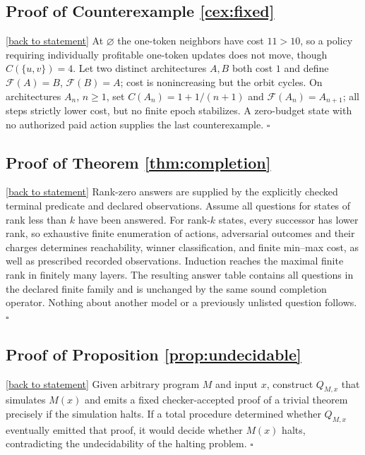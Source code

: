 \documentclass[11pt,letterpaper]{article}
\theoremstyle{definition}
\theoremstyle{remark}
\newcommand{\F}{\mathcal F}
\newcommand{\backlink}[1]{\hyperlink{claim:#1}{\footnotesize[back to statement]}}
\begin{document}
\hypertarget{proof:fixed}{}\subsection*{Proof of Counterexample \ref{cex:fixed}}\backlink{fixed}
At $\varnothing$ the one-token neighbors have cost $11>10$, so a policy requiring individually profitable one-token updates does not move, though $C(\{u,v\})=4$. Let two distinct architectures $A,B$ both cost $1$ and define $\F(A)=B$, $\F(B)=A$; cost is nonincreasing but the orbit cycles. On architectures $A_n$, $n\geq1$, set $C(A_n)=1+1/(n+1)$ and $\F(A_n)=A_{n+1}$; all steps strictly lower cost, but no finite epoch stabilizes. A zero-budget state with no authorized paid action supplies the last counterexample. $\square$

\hypertarget{proof:completion}{}\subsection*{Proof of Theorem \ref{thm:completion}}\backlink{completion}
Rank-zero answers are supplied by the explicitly checked terminal predicate and declared observations. Assume all questions for states of rank less than $k$ have been answered. For rank-$k$ states, every successor has lower rank, so exhaustive finite enumeration of actions, adversarial outcomes and their charges determines reachability, winner classification, and finite min--max cost, as well as prescribed recorded observations. Induction reaches the maximal finite rank in finitely many layers. The resulting answer table contains all questions in the declared finite family and is unchanged by the same sound completion operator. Nothing about another model or a previously unlisted question follows. $\square$

\hypertarget{proof:undecidable}{}\subsection*{Proof of Proposition \ref{prop:undecidable}}\backlink{undecidable}
Given arbitrary program $M$ and input $x$, construct $Q_{M,x}$ that simulates $M(x)$ and emits a fixed checker-accepted proof of a trivial theorem precisely if the simulation halts. If a total procedure determined whether $Q_{M,x}$ eventually emitted that proof, it would decide whether $M(x)$ halts, contradicting the undecidability of the halting problem. $\square$
\end{document}
